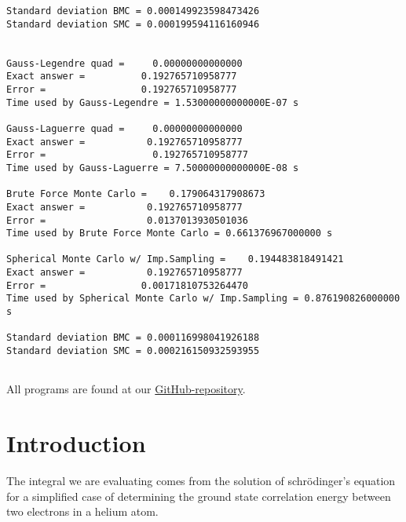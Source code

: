 \documentclass{article}
\begin{document}
\begin{verbatim}
Standard deviation BMC = 0.000149923598473426
Standard deviation SMC = 0.000199594116160946


Gauss-Legendre quad =     0.00000000000000
Exact answer =          0.192765710958777
Error =                 0.192765710958777
Time used by Gauss-Legendre = 1.53000000000000E-07 s

Gauss-Laguerre quad =     0.00000000000000
Exact answer =           0.192765710958777
Error =                   0.192765710958777
Time used by Gauss-Laguerre = 7.50000000000000E-08 s

Brute Force Monte Carlo =    0.179064317908673
Exact answer =           0.192765710958777
Error =                  0.0137013930501036
Time used by Brute Force Monte Carlo = 0.661376967000000 s

Spherical Monte Carlo w/ Imp.Sampling =    0.194483818491421
Exact answer =           0.192765710958777
Error =                 0.00171810753264470
Time used by Spherical Monte Carlo w/ Imp.Sampling = 0.876190826000000 s

Standard deviation BMC = 0.000116998041926188
Standard deviation SMC = 0.000216150932593955


\end{verbatim}

All programs are found at our \href{https://github.com/Erikbgram/Fys3150}{GitHub-repository}. \\



\newpage


\vspace{1cm}

\tableofcontents

\vspace{1cm}

\vspace{1cm}

\section{Introduction} \label{sec:Introduction}

The integral we are evaluating comes from the solution of schrödinger's equation for a simplified case of determining the ground state correlation energy between two electrons in a helium atom.
\end{document}
